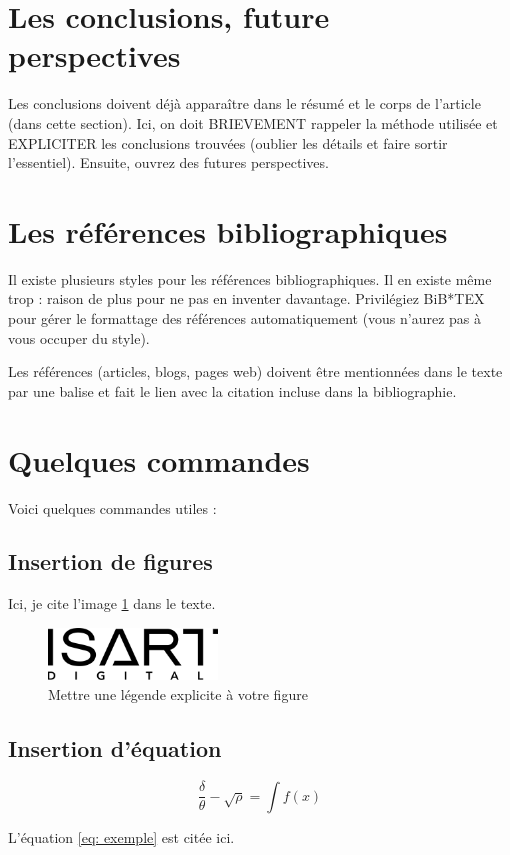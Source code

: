 \documentclass{rapportCS}
\begin{document}
\section{Les conclusions, future perspectives}
Les conclusions doivent déjà apparaître dans le résumé et le corps de l’article (dans cette section). Ici, on doit BRIEVEMENT rappeler la méthode utilisée et EXPLICITER les conclusions trouvées (oublier les détails et faire sortir l'essentiel). Ensuite, ouvrez des futures perspectives. 


\section{Les références bibliographiques}
Il existe plusieurs styles pour les références bibliographiques. Il en existe même trop : raison de plus pour ne pas en inventer davantage.
Privilégiez BiB*TEX pour gérer le formattage des références automatiquement (vous n’aurez pas à vous occuper du style). 

Les références (articles, blogs, pages web) doivent être mentionnées dans le texte par une balise \cite{Addoum2021} \cite{Addoum2021-bis} et fait le lien avec la citation incluse dans la bibliographie.



\newpage






\section{Quelques commandes}

Voici quelques commandes utiles :



\subsection{Insertion de figures}
Ici, je cite l'image \ref{fig:my_label} dans le texte.
\begin{figure}[h!]
    \centering
    \includegraphics[width=0.4\textwidth]{logos/Logo_ISART.png}
    \caption{Mettre une légende explicite à votre figure}
    \label{fig:my_label}
\end{figure}

\subsection{Insertion d'équation}

\begin{equation} \label{eq: exemple}
\frac{\delta}{\theta} - \sqrt{\rho}  = \int f(x)
\end{equation}

L'équation \ref{eq: exemple} est citée ici. 
\end{document}
